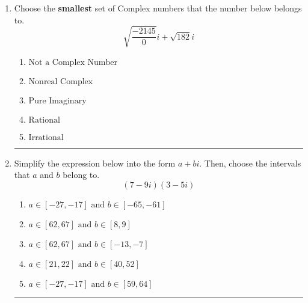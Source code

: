 \documentclass[14pt]{extbook}
\newcommand{\litem}[1]{\item#1\hspace*{-1cm}\rule{\textwidth}{0.4pt}}
\begin{document}
\begin{enumerate}
{\begin{enumerate}[label=\Alph*.]
\end{enumerate} }
\litem{
Choose the \textbf{smallest} set of Complex numbers that the number below belongs to.\[ \sqrt{\frac{-2145}{0}} i+\sqrt{182}i \]\begin{enumerate}[label=\Alph*.]
\item \( \text{Not a Complex Number} \)
\item \( \text{Nonreal Complex} \)
\item \( \text{Pure Imaginary} \)
\item \( \text{Rational} \)
\item \( \text{Irrational} \)

\end{enumerate} }
\litem{
Simplify the expression below into the form $a+bi$. Then, choose the intervals that $a$ and $b$ belong to.\[ (7 - 9 i)(3 - 5 i) \]\begin{enumerate}[label=\Alph*.]
\item \( a \in [-27, -17] \text{ and } b \in [-65, -61] \)
\item \( a \in [62, 67] \text{ and } b \in [8, 9] \)
\item \( a \in [62, 67] \text{ and } b \in [-13, -7] \)
\item \( a \in [21, 22] \text{ and } b \in [40, 52] \)
\item \( a \in [-27, -17] \text{ and } b \in [59, 64] \)

\end{enumerate} }
\end{enumerate}
\end{document}

